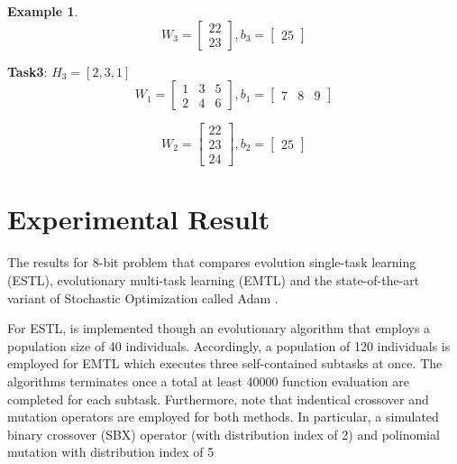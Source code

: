 \documentclass[conference]{IEEEtran}
\theoremstyle{definition}
\newtheorem{example}{Example}[section]
\begin{document}
\begin{example}
    \begin{equation}
      W_3=
      \begin{bmatrix}
        22\\
        23
      \end{bmatrix},
      b_3=
      \begin{bmatrix}
        25
      \end{bmatrix}
    \end{equation}

    \textbf{Task3}: $H_3 = [2, 3, 1]$
    \begin{equation}
      W_1=
      \begin{bmatrix}
        1& 3& 5\\
        2& 4& 6
      \end{bmatrix},
      b_1=
      \begin{bmatrix}
        7& 8& 9
      \end{bmatrix}
    \end{equation}

    \begin{equation}
      W_2=
      \begin{bmatrix}
        22\\
        23\\
        24
      \end{bmatrix},
      b_2=
      \begin{bmatrix}
        25
      \end{bmatrix}
    \end{equation}

  \end{example}


\section{Experimental Result}

  The results for 8-bit problem that compares evolution single-task learning (ESTL), evolutionary multi-task learning (EMTL) and the state-of-the-art variant of Stochastic Optimization called Adam \cite{adam}. 

  For ESTL, is implemented though an evolutionary algorithm that employs a population size of 40 individuals. Accordingly, a population of 120 individuals is employed for EMTL which executes three self-contained subtasks at once. The algorithms terminates once a total at least 40000 function evaluation are completed for each subtask. Furthermore, note that indentical crossover and mutation operators are employed for both methods. In particular, a simulated binary crossover (SBX) operator (with distribution index of 2) \cite{sbx} and polinomial mutation with distribution index of 5 \cite{polinomial-mutate}
\end{document}
